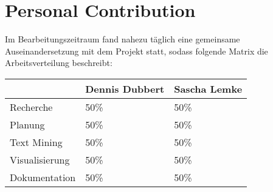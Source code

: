 \section{Personal Contribution}
Im Bearbeitungszeitraum fand nahezu t\"aglich eine gemeinsame Auseinandersetzung mit dem Projekt statt, sodass folgende Matrix die Arbeitsverteilung beschreibt:

\centering
\begin{tabular}{ l | l | l }
  & Dennis Dubbert & Sascha Lemke \\
  \hline
  Recherche & 50\% & 50\% \\
  \hline
  Planung & 50\% & 50\% \\
  \hline
  Text Mining & 50\% & 50\% \\
  \hline
  Visualisierung & 50\% & 50\% \\
  \hline
  Dokumentation & 50\% & 50\% \\
\end{tabular}